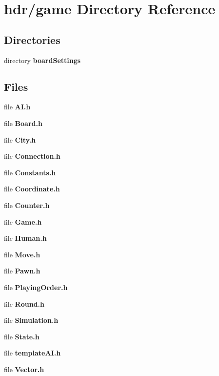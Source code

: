 \section{hdr/game Directory Reference}
\label{dir_f9ac9697e996c45f503885d8d672ac41}
\subsection*{Directories}
\begin{DoxyCompactItemize}
\item 
directory {\bf board\-Settings}
\end{DoxyCompactItemize}
\subsection*{Files}
\begin{DoxyCompactItemize}
\item 
file {\bfseries A\-I.\-h}
\item 
file {\bfseries Board.\-h}
\item 
file {\bfseries City.\-h}
\item 
file {\bfseries Connection.\-h}
\item 
file {\bfseries Constants.\-h}
\item 
file {\bfseries Coordinate.\-h}
\item 
file {\bfseries Counter.\-h}
\item 
file {\bfseries Game.\-h}
\item 
file {\bfseries Human.\-h}
\item 
file {\bfseries Move.\-h}
\item 
file {\bfseries Pawn.\-h}
\item 
file {\bfseries Playing\-Order.\-h}
\item 
file {\bfseries Round.\-h}
\item 
file {\bfseries Simulation.\-h}
\item 
file {\bfseries State.\-h}
\item 
file {\bfseries template\-A\-I.\-h}
\item 
file {\bfseries Vector.\-h}
\end{DoxyCompactItemize}

